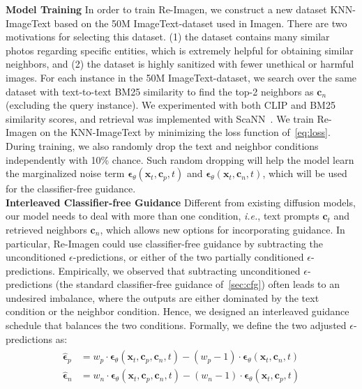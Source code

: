 \documentclass{article} \usepackage{iclr2023_conference,times}
\newcommand{\ie}{\textit{i.e.}}
\newcommand{\modelname}{{Re-Imagen}\xspace}
\begin{document}
\noindent \textbf{Model Training} In order to train \modelname, we construct a new dataset KNN-ImageText based on the 50M ImageText-dataset used in Imagen. There are two motivations for selecting this dataset. (1) the dataset contains many similar photos regarding specific entities, which is extremely helpful for obtaining similar neighbors, and (2) the dataset is highly sanitized with fewer unethical or harmful images. For each instance in the 50M ImageText-dataset, we search over the same dataset with text-to-text BM25 similarity to find the top-2 neighbors as $\bm{c}_n$ (excluding the query instance). We experimented with both CLIP and BM25 similarity scores, and retrieval was implemented with ScaNN~\citep{guo2020accelerating}. We train \modelname on the KNN-ImageText by minimizing the loss function of~\autoref{eq:loss}. During training, we also randomly drop the text and neighbor conditions independently with 10\% chance. Such random dropping will help the model learn the marginalized noise term $\bm{\epsilon}_{\theta}(\bm{x}_{t}, \bm{c}_p, t)$ and $\bm{\epsilon}_{\theta}(\bm{x}_{t}, \bm{c}_n, t)$, which will be used for the classifier-free guidance. \vspace{1ex} \\
\noindent \textbf{Interleaved Classifier-free Guidance}
\label{sec:interleaved}
Different from existing diffusion models, our model needs to deal with more than one condition, \ie, text prompts $\bm{c}_t$ and retrieved neighbors $\bm{c}_n$, which allows new options for incorporating guidance. In particular, \modelname could use classifier-free guidance by subtracting the unconditioned $\epsilon$-predictions, or either of the two partially conditioned $\epsilon$-predictions. Empirically, we observed that subtracting unconditioned $\epsilon$-predictions (the standard classifier-free guidance of~\autoref{sec:cfg}) often leads to an undesired imbalance, where the outputs are either dominated by the text condition or the neighbor condition. Hence, we designed an interleaved guidance schedule that balances the two conditions. Formally, we define the two adjusted $\epsilon$-predictions as:
\begin{align}
\label{eq:sample}
\begin{split}
    \hat{\bm{\epsilon}}_{p} &= w_p \cdot \bm{\epsilon}_{\theta}(\bm{x}_t, \bm{c}_p, \bm{c}_n, t) - (w_p - 1) \cdot \bm{\epsilon}_{\theta}(\bm{x}_t, \bm{c}_n, t) \\
    \hat{\bm{\epsilon}}_{n} &= w_n \cdot \bm{\epsilon}_{\theta}(\bm{x}_t, \bm{c}_p, \bm{c}_n, t) - (w_n - 1) \cdot \bm{\epsilon}_{\theta}(\bm{x}_t, \bm{c}_p, t)
\end{split}
\end{align}
\end{document}

